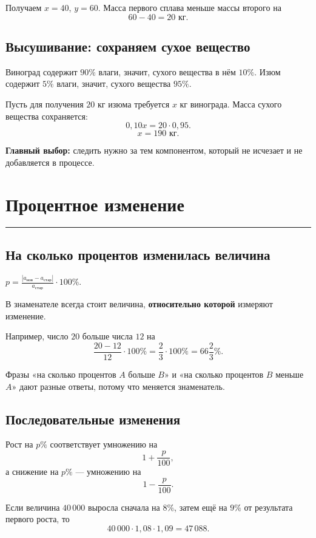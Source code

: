 \documentclass[a4paper,12pt]{article}
\newcommand{\sectionline}{%
  \par\vspace{2pt}
  {\color{accent}\rule{\linewidth}{0.7pt}}
  \vspace{4pt}
}
\newcommand{\key}[1]{\textcolor{darkaccent}{\textbf{#1}}}
\newcommand{\formula}[1]{%
  \begin{center}
    \begin{minipage}{0.9\linewidth}
      \centering\large\color{darkaccent}#1
    \end{minipage}
  \end{center}
}
\begin{document}
Получаем $x=40$, $y=60$. Масса первого сплава меньше массы второго на
\[
  60-40=20\text{ кг}.
\]

\subsection{Высушивание: сохраняем сухое вещество}

Виноград содержит $90\%$ влаги, значит, сухого вещества в нём $10\%$.
Изюм содержит $5\%$ влаги, значит, сухого вещества $95\%$.

Пусть для получения $20$ кг изюма требуется $x$ кг винограда. Масса сухого
вещества сохраняется:
\[
  0{,}10x=20\cdot0{,}95.
\]
\[
  x=190\text{ кг}.
\]

\key{Главный выбор:} следить нужно за тем компонентом, который не исчезает и
не добавляется в процессе.

\section{Процентное изменение}
\sectionline

\subsection{На сколько процентов изменилась величина}

\formula{
  $\displaystyle
  p=\frac{|a_{\text{нов}}-a_{\text{стар}}|}{a_{\text{стар}}}\cdot100\%$.
}

В знаменателе всегда стоит величина, \key{относительно которой} измеряют
изменение.

Например, число $20$ больше числа $12$ на
\[
  \frac{20-12}{12}\cdot100\%
  =\frac{2}{3}\cdot100\%
  =66\frac{2}{3}\%.
\]

Фразы «на сколько процентов $A$ больше $B$» и «на сколько процентов $B$
меньше $A$» дают разные ответы, потому что меняется знаменатель.

\subsection{Последовательные изменения}

Рост на $p\%$ соответствует умножению на
\[
  1+\frac{p}{100},
\]
а снижение на $p\%$ --- умножению на
\[
  1-\frac{p}{100}.
\]

Если величина $40\,000$ выросла сначала на $8\%$, затем ещё на $9\%$
от результата первого роста, то
\[
  40\,000\cdot1{,}08\cdot1{,}09=47\,088.
\]
\end{document}
